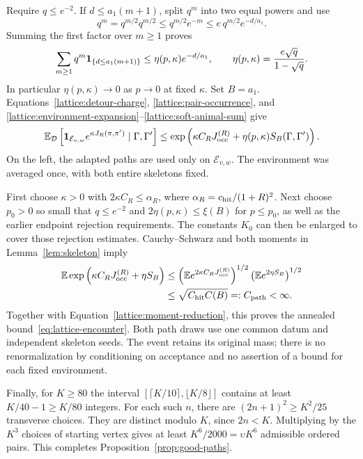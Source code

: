 Require $q\le e^{-2}$. If $d\le a_1(m+1)$, split $q^m$ into two equal
powers and use
\[
 q^m=q^{m/2}q^{m/2}\le q^{m/2}e^{-m}
                       \le e\,q^{m/2}e^{-d/a_1}.
\]
Summing the first factor over $m\ge1$ proves
\begin{equation}\label{lattice:soft-animal-sum}
 \sum_{m\ge1}q^m\mathbf 1_{\{d\le a_1(m+1)\}}
 \le\eta(p,\kappa)e^{-d/a_1},
 \qquad \eta(p,\kappa)=\frac{e\sqrt q}{1-\sqrt q}.
\end{equation}
In particular $\eta(p,\kappa)\to0$ as $p\to0$ at fixed $\kappa$.
Set $B=a_1$. Equations~\eqref{lattice:detour-charge},
\eqref{lattice:pair-occurrence}, and
\eqref{lattice:environment-expansion}--\eqref{lattice:soft-animal-sum} give
\begin{equation}\label{lattice:moment-reduction}
 \mathbb E_{\mathcal D}\left[
  \mathbf 1_{\mathcal E_{v,w}}e^{\kappa J_R(\pi,\pi')}
       \mid\Gamma,\Gamma'\right]
 \le\exp\left(\kappa C_RJ_{\rm occ}^{(R)}+
                      \eta(p,\kappa)S_B(\Gamma,\Gamma')\right).
\end{equation}
On the left, the adapted paths are used only on $\mathcal E_{v,w}$.
The environment was averaged once, with both entire skeletons fixed.

First choose $\kappa>0$ with $2\kappa C_R\le\alpha_R$, where
$\alpha_R=c_{\rm hit}/(1+R)^2$. Next choose $p_0>0$ so small that
$q\le e^{-2}$ and $2\eta(p,\kappa)\le\xi(B)$ for $p\le p_0$, as well
as the earlier endpoint rejection requirements. The constants $K_0$ can
then be enlarged to cover those rejection estimates. Cauchy--Schwarz and
both moments in Lemma~\ref{lem:skeleton} imply
\begin{align*}
 \mathbb E\exp\left(\kappa C_RJ_{\rm occ}^{(R)}+\eta S_B\right)
 &\le
 \left(\mathbb E e^{2\kappa C_RJ_{\rm occ}^{(R)}}\right)^{1/2}
 \left(\mathbb E e^{2\eta S_B}\right)^{1/2}\\
 &\le\sqrt{C_{\rm hit}C(B)}=:C_{\rm path}<\infty.
\end{align*}
Together with Equation~\eqref{lattice:moment-reduction}, this proves the
annealed bound~\eqref{eq:lattice-encounter}. Both path draws use one common
datum and independent skeleton seeds. The event retains its original
mass; there is no renormalization by conditioning on acceptance and no
assertion of a bound for each fixed environment.

Finally, for $K\ge80$ the interval
$[\lceil K/10\rceil,\lfloor K/8\rfloor]$ contains at least
$K/40-1\ge K/80$ integers. For each such $n$, there are
$(2n+1)^2\ge K^2/25$ transverse choices. They are distinct modulo $K$,
since $2n<K$. Multiplying by the $K^3$ choices of starting vertex gives
at least $K^6/2000=\upsilon K^6$ admissible ordered pairs. This completes
Proposition~\ref{prop:good-paths}.
